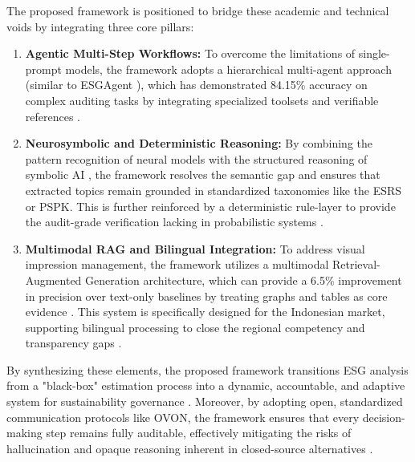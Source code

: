 \documentclass{article}
\begin{document}
The proposed framework is positioned to bridge these academic and technical voids by integrating three core pillars:
\begin{enumerate}
\item 

\textbf{Agentic Multi-Step Workflows:} To overcome the limitations of single-prompt models, the framework adopts a hierarchical multi-agent approach (similar to ESGAgent  \parencite{yilei_zhao_b7bbd9c8}), which has demonstrated 84.15\% accuracy on complex auditing tasks by integrating specialized toolsets and verifiable references  \parencite{yilei_zhao_b7bbd9c8}.\item 

\textbf{Neurosymbolic and Deterministic Reasoning:} By combining the pattern recognition of neural models with the structured reasoning of symbolic AI  \parencite{wihan_van_der_heever_5ff35709}, the framework resolves the semantic gap and ensures that extracted topics remain grounded in standardized taxonomies like the ESRS or PSPK. This is further reinforced by a deterministic rule-layer to provide the audit-grade verification lacking in probabilistic systems  \parencite{steven_paul_nohr_a6874924}.\item 

\textbf{Multimodal RAG and Bilingual Integration:} To address visual impression management, the framework utilizes a multimodal Retrieval-Augmented Generation architecture, which can provide a 6.5\% improvement in precision over text-only baselines by treating graphs and tables as core evidence  \parencite{g_saipooja_m_n_488bfdd6}. This system is specifically designed for the Indonesian market, supporting bilingual processing to close the regional competency and transparency gaps  \parencite[]{amrie_firmansyah_fd5249a2, tri_siwi_nugrahani_056a6914}.
\end{enumerate}

By synthesizing these elements, the proposed framework transitions ESG analysis from a "black-box" estimation process into a dynamic, accountable, and adaptive system for sustainability governance  \parencite{thong_hoang_d30a390b}. Moreover, by adopting open, standardized communication protocols like OVON, the framework ensures that every decision-making step remains fully auditable, effectively mitigating the risks of hallucination and opaque reasoning inherent in closed-source alternatives  \parencite{diego_gosmar_0ee23d5f}. 
\printbibliography
\end{document}
